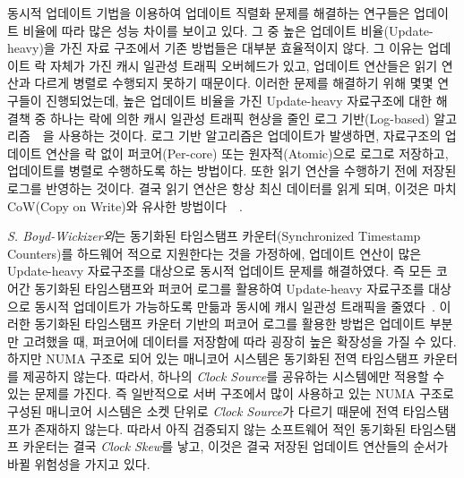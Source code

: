 동시적 업데이트 기법을 이용하여 업데이트 직렬화 문제를 해결하는 연구들은 
업데이트 비율에 따라 많은 성능 차이를 보이고 있다.
그 중 높은 업데이트 비율(Update-heavy)을 가진 자료 구조에서 기존 방법들은 대부분 효율적이지 않다.
그 이유는 업데이트 락 자체가 가진 캐시 일관성 트래픽 오버헤드가 있고, 업데이트 연산들은 읽기 연산과 
다르게 병렬로 수행되지 못하기 때문이다.
이러한 문제를 해결하기 위해 몇몇 연구들이 진행되었는데, 
높은 업데이트 비율을 가진 Update-heavy 자료구조에 대한 해결책 중 
하나는 락에 의한 캐시 일관성 트래픽 현상을 줄인 로그 기반(Log-based)
알고리즘~\cite{Hendler2010FC}~\cite{SilasBoydWickizerPth}을 사용하는 것이다.
로그 기반 알고리즘은 업데이트가 발생하면, 자료구조의 업데이트 연산을 
락 없이 퍼코어(Per-core) 또는 원자적(Atomic)으로 로그로 저장하고, 업데이트를 병렬로 수행하도록 하는 방법이다.
또한 읽기 연산을 수행하기 전에 저장된 로그를 반영하는 것이다.
결국 읽기 연산은 항상 최신 데이터를 읽게 되며, 이것은 마치 CoW(Copy on Write)와
유사한 방법이다~\cite{PaulDetailLWN}~\cite{Morrison2016SSM}.

\textit{S. Boyd-Wickizer외}는 동기화된 타임스탬프 카운터(Synchronized Timestamp
Counters)를 하드웨어 적으로 지원한다는 것을 가정하에, 업데이트 연산이 많은 Update-heavy 자료구조를 
대상으로 동시적 업데이트 문제를 해결하였다.
즉 모든 코어간 동기화된 타임스탬프와 퍼코어 로그를 활용하여 Update-heavy 자료구조를 대상으로 
동시적 업데이트가 가능하도록 만듦과 동시에 캐시 일관성 트래픽을 줄였다~\cite{SilasBoydWickizerPth}.
이러한 동기화된 타임스탬프 카운터 기반의 퍼코어 로그를 활용한 방법은
업데이트 부분만 고려했을 때, 퍼코어에 데이터를 저장함에 따라 굉장히 높은 확장성을 가질 수 있다.
하지만 NUMA 구조로 되어 있는 매니코어 시스템은 동기화된 전역 타임스탬프 카운터를 제공하지 
않는다. 
따라서, 하나의 \textit{Clock Source}를 공유하는 시스템에만 적용할 수 있는 문제를 가진다.
즉 일반적으로 서버 구조에서 많이 사용하고 있는 NUMA 구조로 구성된 매니코어 시스템은 소켓 단위로 
\textit{Clock Source}가 다르기 때문에 전역 타임스탬프가 존재하지 않는다. 
따라서 아직 검증되지 않는 소프트웨어 적인 동기화된 타임스탬프 카운터는 결국 \textit{Clock Skew}를 낳고, 
이것은 결국 저장된 업데이트 연산들의 순서가 바뀔 위험성을 가지고 있다.

